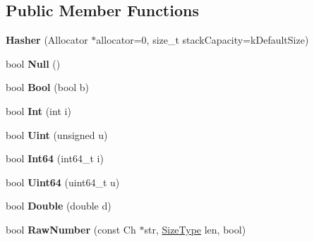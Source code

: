 \subsection*{Public Member Functions}
\begin{DoxyCompactItemize}
\item 
{\bfseries Hasher} (Allocator $\ast$allocator=0, size\+\_\+t stack\+Capacity=k\+Default\+Size)\hypertarget{classinternal_1_1Hasher_a7b6abfdd3bdc60064a2322cdd20708c1}{}\label{classinternal_1_1Hasher_a7b6abfdd3bdc60064a2322cdd20708c1}

\item 
bool {\bfseries Null} ()\hypertarget{classinternal_1_1Hasher_a57c656866aa08cc7c448ce47b7a243c3}{}\label{classinternal_1_1Hasher_a57c656866aa08cc7c448ce47b7a243c3}

\item 
bool {\bfseries Bool} (bool b)\hypertarget{classinternal_1_1Hasher_a11efd784a4e9c4f8a3dc281552df0486}{}\label{classinternal_1_1Hasher_a11efd784a4e9c4f8a3dc281552df0486}

\item 
bool {\bfseries Int} (int i)\hypertarget{classinternal_1_1Hasher_aadbadf98ee7c9ab03a636e0f06d38bac}{}\label{classinternal_1_1Hasher_aadbadf98ee7c9ab03a636e0f06d38bac}

\item 
bool {\bfseries Uint} (unsigned u)\hypertarget{classinternal_1_1Hasher_a4401600c24c817a45cea6c281438e5b4}{}\label{classinternal_1_1Hasher_a4401600c24c817a45cea6c281438e5b4}

\item 
bool {\bfseries Int64} (int64\+\_\+t i)\hypertarget{classinternal_1_1Hasher_ae0579cd54b3c545f77452543793b9a97}{}\label{classinternal_1_1Hasher_ae0579cd54b3c545f77452543793b9a97}

\item 
bool {\bfseries Uint64} (uint64\+\_\+t u)\hypertarget{classinternal_1_1Hasher_a14832ac4ec204f1065b929df2c255457}{}\label{classinternal_1_1Hasher_a14832ac4ec204f1065b929df2c255457}

\item 
bool {\bfseries Double} (double d)\hypertarget{classinternal_1_1Hasher_a83abe847e24ed88d5aab092d840e37c1}{}\label{classinternal_1_1Hasher_a83abe847e24ed88d5aab092d840e37c1}

\item 
bool {\bfseries Raw\+Number} (const Ch $\ast$str, \hyperlink{rapidjson_8h_a5ed6e6e67250fadbd041127e6386dcb5}{Size\+Type} len, bool)\hypertarget{classinternal_1_1Hasher_ae277289ad2fb3a938a6507e566d3c5e2}{}\label{classinternal_1_1Hasher_ae277289ad2fb3a938a6507e566d3c5e2}


\end{DoxyCompactItemize}
